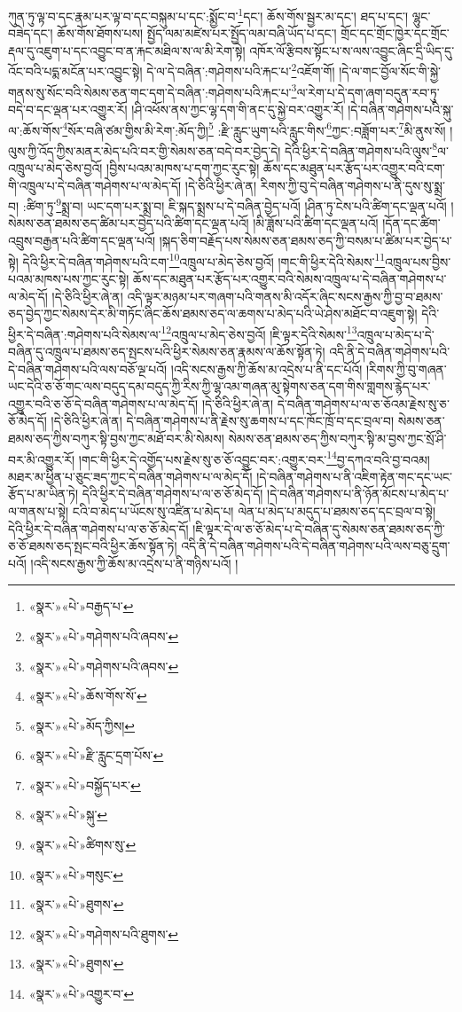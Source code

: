 ཀུན་ཏུ་ལྟ་བ་དང་རྣམ་པར་ལྟ་བ་དང་བསྐུམ་པ་དང་:སྨྱོང་བ་\footnote{«སྣར་»«པེ་»བརྒྱད་པ་}དང་། ཆོས་གོས་སྦྱར་མ་དང་། ཐད་པ་དང་། ལྷུང་བཟེད་དང་། ཆོས་གོས་ཐོགས་པས། སྤྱོད་ལམ་མཛེས་པར་སྤྱོད་ལམ་བཞི་ཡོད་པ་དང་། གྲོང་དང་གྲོང་ཁྱེར་དང་གྲོང་རྡལ་དུ་འཇུག་པ་དང་འབྱུང་བ་ན་རྐང་མཐིལ་ས་ལ་མི་རེག་སྟེ། འཁོར་ལོ་རྩིབས་སྟོང་པ་ས་ལས་འབྱུང་ཞིང་དྲི་ཡིད་དུ་འོང་བའི་པདྨ་མངོན་པར་འབྱུང་སྟེ། དེ་ལ་དེ་བཞིན་:གཤེགས་པའི་རྐང་པ་\footnote{«སྣར་»«པེ་»གཤེགས་པའི་ཞབས་}འཇོག་གོ། །དེ་ལ་གང་བྱོལ་སོང་གི་སྐྱེ་གནས་སུ་སོང་བའི་སེམས་ཅན་གང་དག་དེ་བཞིན་:གཤེགས་པའི་རྐང་པ་\footnote{«སྣར་»«པེ་»གཤེགས་པའི་ཞབས་}ལ་རེག་པ་དེ་དག་ཞག་བདུན་རབ་ཏུ་བདེ་བ་དང་ལྡན་པར་འགྱུར་རོ། །ཤི་འཕོས་ནས་ཀྱང་ལྷ་དག་གི་ནང་དུ་སྐྱེ་བར་འགྱུར་རོ། །དེ་བཞིན་གཤེགས་པའི་སྐུ་ལ་:ཆོས་གོས་\footnote{«སྣར་»«པེ་»ཆོས་གོས་སོ་}སོར་བཞི་ཙམ་གྱིས་མི་རེག་:མོད་ཀྱི།\footnote{«སྣར་»«པེ་»མོད་ཀྱིས།} :རྫི་རླུང་ཡུག་པའི་རླུང་གིས་\footnote{«སྣར་»«པེ་»རྫི་རླུང་དྲག་པོས་}ཀྱང་:བཟློག་པར་\footnote{«སྣར་»«པེ་»བསྐྱོད་པར་}མི་ནུས་སོ། །ལུས་ཀྱི་འོད་ཀྱིས་མནར་མེད་པའི་བར་གྱི་སེམས་ཅན་བདེ་བར་བྱེད་དེ། དེའི་ཕྱིར་དེ་བཞིན་གཤེགས་པའི་ལུས་\footnote{«སྣར་»«པེ་»སྐུ་}ལ་འཁྲུལ་པ་མེད་ཅེས་བྱའོ། །བྱིས་པའམ་མཁས་པ་དག་ཀྱང་རུང་སྟེ། ཆོས་དང་མཐུན་པར་རྩོད་པར་འགྱུར་བའི་ངག་གི་འཁྲུལ་པ་དེ་བཞིན་གཤེགས་པ་ལ་མེད་དོ། །དེ་ཅིའི་ཕྱིར་ཞེ་ན། རིགས་ཀྱི་བུ་དེ་བཞིན་གཤེགས་པ་ནི་དུས་སུ་སྨྲ་བ། :ཚིག་ཏུ་\footnote{«སྣར་»«པེ་»ཚིགས་སུ་}སྨྲ་བ། ཡང་དག་པར་སྨྲ་བ། ཇི་སྐད་སྨྲས་པ་དེ་བཞིན་བྱེད་པའོ། །ཤིན་ཏུ་ངེས་པའི་ཚིག་དང་ལྡན་པའོ། །སེམས་ཅན་ཐམས་ཅད་ཚིམ་པར་བྱེད་པའི་ཚིག་དང་ལྡན་པའོ། །མི་ཟློས་པའི་ཚིག་དང་ལྡན་པའོ། །དོན་དང་ཚིག་འབྲུས་བརྒྱན་པའི་ཚིག་དང་ལྡན་པའོ། །སྐད་ཅིག་བརྗོད་པས་སེམས་ཅན་ཐམས་ཅད་ཀྱི་བསམ་པ་ཚིམ་པར་བྱེད་པ་སྟེ། དེའི་ཕྱིར་དེ་བཞིན་གཤེགས་པའི་ངག་\footnote{«སྣར་»«པེ་»གསུང་}འཁྲུལ་པ་མེད་ཅེས་བྱའོ། །གང་གི་ཕྱིར་དེའི་སེམས་\footnote{«སྣར་»«པེ་»ཐུགས་}འཁྲུལ་པས་བྱིས་པའམ་མཁས་པས་ཀྱང་རུང་སྟེ། ཆོས་དང་མཐུན་པར་རྩོད་པར་འགྱུར་བའི་སེམས་འཁྲུལ་པ་དེ་བཞིན་གཤེགས་པ་ལ་མེད་དོ། །དེ་ཅིའི་ཕྱིར་ཞེ་ན། འདི་ལྟར་མཉམ་པར་གཞག་པའི་གནས་མི་འདོར་ཞིང་སངས་རྒྱས་ཀྱི་བྱ་བ་ཐམས་ཅད་བྱེད་ཀྱང་སེམས་དེར་མི་གཏོང་ཞིང་ཆོས་ཐམས་ཅད་ལ་ཆགས་པ་མེད་པའི་ཡེ་ཤེས་མཐོང་བ་འཇུག་སྟེ། དེའི་ཕྱིར་དེ་བཞིན་:གཤེགས་པའི་སེམས་ལ་\footnote{«སྣར་»«པེ་»གཤེགས་པའི་ཐུགས་}འཁྲུལ་པ་མེད་ཅེས་བྱའོ། །ཇི་ལྟར་དེའི་སེམས་\footnote{«སྣར་»«པེ་»ཐུགས་}འཁྲུལ་པ་མེད་པ་དེ་བཞིན་དུ་འཁྲུལ་པ་ཐམས་ཅད་སྤངས་པའི་ཕྱིར་སེམས་ཅན་རྣམས་ལ་ཆོས་སྟོན་ཏེ། འདི་ནི་དེ་བཞིན་གཤེགས་པའི་དེ་བཞིན་གཤེགས་པའི་ལས་བཅོ་ལྔ་པའོ། །འདི་སངས་རྒྱས་ཀྱི་ཆོས་མ་འདྲེས་པ་ནི་དང་པོའོ། །རིགས་ཀྱི་བུ་གཞན་ཡང་དེའི་ཅ་ཅོ་གང་ལས་བདུད་དམ་བདུད་ཀྱི་རིས་ཀྱི་ལྷ་འམ་གཞན་མུ་སྟེགས་ཅན་དག་གིས་གླགས་རྙེད་པར་འགྱུར་བའི་ཅ་ཅོ་དེ་བཞིན་གཤེགས་པ་ལ་མེད་དོ། །དེ་ཅིའི་ཕྱིར་ཞེ་ན། དེ་བཞིན་གཤེགས་པ་ལ་ཅ་ཅོའམ་རྗེས་སུ་ཅ་ཅོ་མེད་དོ། །དེ་ཅིའི་ཕྱིར་ཞེ་ན། དེ་བཞིན་གཤེགས་པ་ནི་རྗེས་སུ་ཆགས་པ་དང་ཁོང་ཁྲོ་བ་དང་བྲལ་བ། སེམས་ཅན་ཐམས་ཅད་ཀྱིས་བཀུར་སྟི་བྱས་ཀྱང་མཐོ་བར་མི་སེམས། སེམས་ཅན་ཐམས་ཅད་ཀྱིས་བཀུར་སྟི་མ་བྱས་ཀྱང་སྲོ་ཤི་བར་མི་འགྱུར་རོ། །གང་གི་ཕྱིར་དེ་འགྱོད་པས་རྗེས་སུ་ཅ་ཅོ་འབྱུང་བར་:འགྱུར་བར་\footnote{«སྣར་»«པེ་»འགྱུར་བ་}བྱ་དཀའ་བའི་བྱ་བའམ། མཐར་མ་ཕྱིན་པ་ཅུང་ཟད་ཀྱང་དེ་བཞིན་གཤེགས་པ་ལ་མེད་དོ། །དེ་བཞིན་གཤེགས་པ་ནི་འཇིག་རྟེན་གང་དང་ཡང་རྩོད་པ་མ་ཡིན་ཏེ། དེའི་ཕྱིར་དེ་བཞིན་གཤེགས་པ་ལ་ཅ་ཅོ་མེད་དོ། །དེ་བཞིན་གཤེགས་པ་ནི་ཉོན་མོངས་པ་མེད་པ་ལ་གནས་པ་སྟེ། ངའི་བ་མེད་པ་ཡོངས་སུ་འཛིན་པ་མེད་པ། ལེན་པ་མེད་པ་མདུད་པ་ཐམས་ཅད་དང་བྲལ་བ་སྟེ། དེའི་ཕྱིར་དེ་བཞིན་གཤེགས་པ་ལ་ཅ་ཅོ་མེད་དོ། །ཇི་ལྟར་དེ་ལ་ཅ་ཅོ་མེད་པ་དེ་བཞིན་དུ་སེམས་ཅན་ཐམས་ཅད་ཀྱི་ཅ་ཅོ་ཐམས་ཅད་སྤང་བའི་ཕྱིར་ཆོས་སྟོན་ཏེ། འདི་ནི་དེ་བཞིན་གཤེགས་པའི་དེ་བཞིན་གཤེགས་པའི་ལས་བཅུ་དྲུག་པའོ། །འདི་སངས་རྒྱས་ཀྱི་ཆོས་མ་འདྲེས་པ་ནི་གཉིས་པའོ། །

